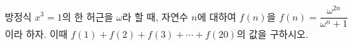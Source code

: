 방정식 $x^3=1$의 한 허근을 $\omega$라 할 때, 자연수 $n$에 대하여 $f(n)$을 $f(n)=\dfrac{\omega^{2n}}{\omega^n+1}$이라 하자. 이때 $f(1)+f(2)+f(3)+\cdots+f(20)$의 값을 구하시오.
